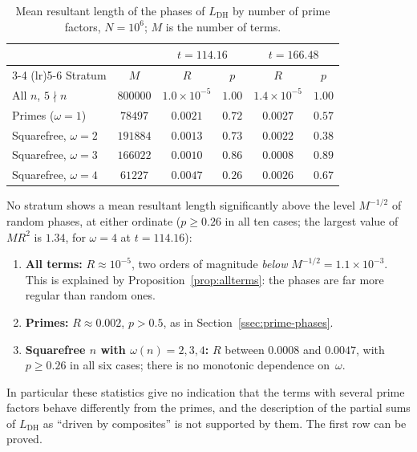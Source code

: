 \documentclass[11pt]{amsart}
\theoremstyle{definition}
\theoremstyle{remark}
\renewcommand{\DH}{\mathrm{DH}}
\begin{document}
\begin{table}[ht]
\centering
\caption{Mean resultant length of the phases of $L_{\DH}$ by number of
  prime factors, $N = 10^6$; $M$ is the number of terms.}
\label{tab:composite-coherence}
\begin{tabular}{@{}lccccc@{}}
\toprule
 & & \multicolumn{2}{c}{$t = 114.16$} &
   \multicolumn{2}{c}{$t = 166.48$} \\
\cmidrule(lr){3-4} \cmidrule(lr){5-6}
Stratum & $M$ & $R$ & $p$ & $R$ & $p$ \\
\midrule
All $n$, $5\nmid n$ & $800000$ & $1.0\times10^{-5}$ & $1.00$ &
                    $1.4\times10^{-5}$ & $1.00$ \\
Primes ($\omega=1$) & $78497$ & $0.0021$ & $0.72$ &
                      $0.0027$ & $0.57$ \\
Squarefree, $\omega = 2$      & $191884$ & $0.0013$ & $0.73$ &
                     $0.0022$ & $0.38$ \\
Squarefree, $\omega = 3$      & $166022$ & $0.0010$ & $0.86$ &
                     $0.0008$ & $0.89$ \\
Squarefree, $\omega = 4$      & $61227$ & $0.0047$ & $0.26$ &
                     $0.0026$ & $0.67$ \\
\bottomrule
\end{tabular}
\end{table}

No stratum shows a mean resultant length significantly above the level
$M^{-1/2}$ of random phases, at either ordinate ($p\ge0.26$ in all ten
cases; the largest value of $MR^2$ is $1.34$, for $\omega=4$ at
$t=114.16$):

\begin{enumerate}
\item \textbf{All terms:} $R\approx10^{-5}$, two orders of magnitude
  \emph{below} $M^{-1/2}=1.1\times10^{-3}$.  This is explained by
  Proposition~\ref{prop:allterms}: the phases are far more regular than
  random ones.

\item \textbf{Primes:} $R \approx 0.002$, $p > 0.5$, as in
  Section~\ref{ssec:prime-phases}.

\item \textbf{Squarefree $n$ with $\omega(n)=2,3,4$:} $R$ between
  $0.0008$ and $0.0047$, with $p\ge0.26$ in all six cases; there is no
  monotonic dependence on~$\omega$.
\end{enumerate}

In particular these statistics give no indication that the terms with
several prime factors behave differently from the primes, and the
description of the partial sums of $L_{\DH}$ as ``driven by composites''
is not supported by them.  The first row can be proved.
\end{document}
